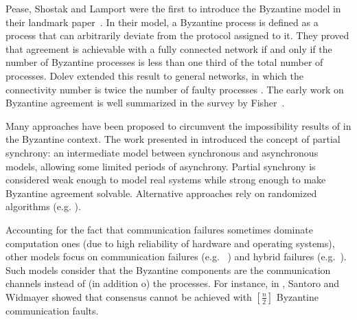 \documentclass[11pt]{article}
\begin{document}
Pease, Shostak and Lamport were the first to introduce
the Byzantine model in their landmark
paper~\cite{lamport1982byzantine,pease1980reaching}.
In their model, a Byzantine process is defined as a process that can
arbitrarily deviate from the protocol assigned to it.
They proved that  agreement is achievable
with a fully connected network if and only if the number of Byzantine
processes is less than one third of the total number of
processes. Dolev extended this
result to general networks, in which the connectivity number is twice
the number of faulty processes \cite{dolev1982byzantine}.
The early work on Byzantine agreement
is well summarized in the survey by Fisher~{\cite{fischer1983consensus}}.

Many approaches have been proposed to circumvent the impossibility results of
\cite{fischer1985impossibility} in the Byzantine context.
The work presented in \cite{dwork1988consensus} introduced the concept
of partial synchrony: an intermediate model between
synchronous and asynchronous models, allowing some
limited periods of asynchrony. Partial synchrony is considered weak enough to model  real systems
while  strong enough to make Byzantine agreement solvable.
Alternative approaches rely on randomized algorithms (e.g.
{\cite{braud2013fast,dwork1988fault,king2011load,rabin1983randomized}}).

Accounting for the fact that communication failures sometimes dominate
computation ones (due to high reliability of hardware and operating systems), other models
focus on communication failures (e.g.
~{\cite{perry1986distributed,schmid2002formally}}) and hybrid failures
(e.g.~{\cite{gong1998byzantine,lincoln1993formally}}). Such models
consider that the Byzantine components are the communication channels instead of 
(in addition o) the processes.
For instance, in \cite{santoro1989time,santoro2007agreement}, Santoro and Widmayer
showed that consensus cannot be achieved with $\left[ \frac{n}{2} \right]$
Byzantine communication faults.
%
\end{document}
